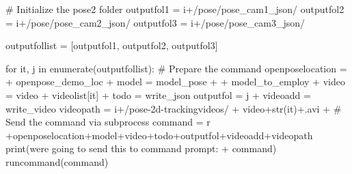 \documentclass[
  letterpaper,
  DIV=11,
  numbers=noendperiod]{scrreprt}
\newenvironment{Shaded}{\begin{snugshade}}{\end{snugshade}}
\newcommand{\BuiltInTok}[1]{\textcolor[rgb]{0.00,0.23,0.31}{#1}}
\newcommand{\CommentTok}[1]{\textcolor[rgb]{0.37,0.37,0.37}{#1}}
\newcommand{\ControlFlowTok}[1]{\textcolor[rgb]{0.00,0.23,0.31}{#1}}
\newcommand{\KeywordTok}[1]{\textcolor[rgb]{0.00,0.23,0.31}{#1}}
\newcommand{\NormalTok}[1]{\textcolor[rgb]{0.00,0.23,0.31}{#1}}
\newcommand{\OperatorTok}[1]{\textcolor[rgb]{0.37,0.37,0.37}{#1}}
\newcommand{\StringTok}[1]{\textcolor[rgb]{0.13,0.47,0.30}{#1}}
\newcommand{\VerbatimStringTok}[1]{\textcolor[rgb]{0.13,0.47,0.30}{#1}}
\begin{document}
\begin{Shaded}
\begin{Highlighting}[]
    \CommentTok{\# Initialize the pose2 folder}
\NormalTok{    outputfol1 }\OperatorTok{=}\NormalTok{ i}\OperatorTok{+}\StringTok{\textquotesingle{}/pose/pose\_cam1\_json/\textquotesingle{}}
\NormalTok{    outputfol2 }\OperatorTok{=}\NormalTok{ i}\OperatorTok{+}\StringTok{\textquotesingle{}/pose/pose\_cam2\_json/\textquotesingle{}}
\NormalTok{    outputfol3 }\OperatorTok{=}\NormalTok{ i}\OperatorTok{+}\StringTok{\textquotesingle{}/pose/pose\_cam3\_json/\textquotesingle{}}

\NormalTok{    outputfollist }\OperatorTok{=}\NormalTok{ [outputfol1, outputfol2, outputfol3]}

    \ControlFlowTok{for}\NormalTok{ it, j }\KeywordTok{in} \BuiltInTok{enumerate}\NormalTok{(outputfollist):}
        \CommentTok{\# Prepare the command}
\NormalTok{        openposelocation }\OperatorTok{=} \StringTok{\textquotesingle{} \textquotesingle{}} \OperatorTok{+}\NormalTok{ openpose\_demo\_loc }\OperatorTok{+} \StringTok{\textquotesingle{} \textquotesingle{}}
\NormalTok{        model }\OperatorTok{=} \StringTok{\textquotesingle{}{-}{-}model\_pose\textquotesingle{}} \OperatorTok{+} \StringTok{\textquotesingle{} \textquotesingle{}} \OperatorTok{+}\NormalTok{ model\_to\_employ }\OperatorTok{+} \StringTok{\textquotesingle{} \textquotesingle{}}
\NormalTok{        video }\OperatorTok{=} \StringTok{\textquotesingle{}{-}{-}video \textquotesingle{}} \OperatorTok{+}\NormalTok{ videolist[it] }\OperatorTok{+} \StringTok{\textquotesingle{} \textquotesingle{}}
\NormalTok{        todo }\OperatorTok{=} \StringTok{\textquotesingle{}{-}{-}write\_json \textquotesingle{}}
\NormalTok{        outputfol }\OperatorTok{=}\NormalTok{ j }\OperatorTok{+} \StringTok{\textquotesingle{} \textquotesingle{}}
\NormalTok{        videoadd }\OperatorTok{=} \StringTok{\textquotesingle{}{-}{-}write\_video \textquotesingle{}}
\NormalTok{        videopath }\OperatorTok{=}\NormalTok{ i}\OperatorTok{+}\StringTok{\textquotesingle{}/pose{-}2d{-}trackingvideos/\textquotesingle{}} \OperatorTok{+} \StringTok{\textquotesingle{}video\textquotesingle{}}\OperatorTok{+}\BuiltInTok{str}\NormalTok{(it)}\OperatorTok{+}\StringTok{\textquotesingle{}.avi\textquotesingle{}} \OperatorTok{+} \StringTok{\textquotesingle{} \textquotesingle{}}
        \CommentTok{\# Send the command via subprocess}
\NormalTok{        command }\OperatorTok{=} \VerbatimStringTok{r\textquotesingle{} \textquotesingle{}}\OperatorTok{+}\NormalTok{openposelocation}\OperatorTok{+}\NormalTok{model}\OperatorTok{+}\NormalTok{video}\OperatorTok{+}\NormalTok{todo}\OperatorTok{+}\NormalTok{outputfol}\OperatorTok{+}\NormalTok{videoadd}\OperatorTok{+}\NormalTok{videopath}
        \BuiltInTok{print}\NormalTok{(}\StringTok{\textquotesingle{}were going to send this to command prompt: \textquotesingle{}} \OperatorTok{+}\NormalTok{ command)}
\NormalTok{        runcommand(command)}
\end{Highlighting}
\end{Shaded}
\end{document}
